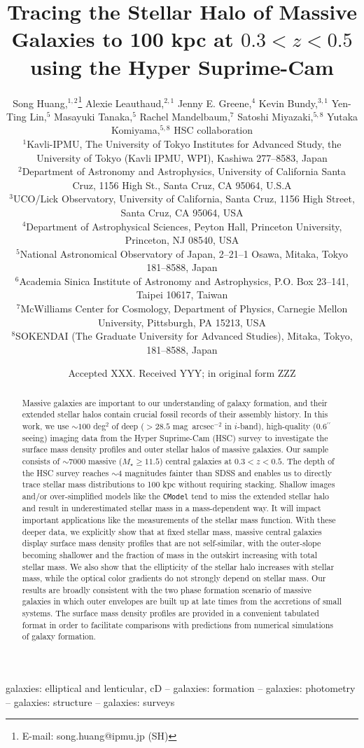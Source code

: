 \documentclass[a4paper,fleqn,usenatbib]{mnras}
\title[Mass Dependent Stellar Halo in Massive Galaxies]{Tracing the Stellar Halo of 
	   Massive Galaxies to 100 kpc at $0.3<z<0.5$ using the Hyper Suprime-Cam}
\author[S. Huang et al.]{
        Song Huang,$^{1,2}$\thanks{E-mail: song.huang@ipmu.jp (SH)}
        Alexie Leauthaud,$^{2,1}$
        Jenny E. Greene,$^{4}$
        Kevin Bundy,$^{3,1}$
        \newauthor
        Yen-Ting Lin,$^{5}$
        Masayuki Tanaka,$^{5}$
        Rachel Mandelbaum,$^{7}$
        Satoshi Miyazaki,$^{5,8}$
        \newauthor
        Yutaka Komiyama,$^{5,8}$
        HSC collaboration 
        \\
        $^{1}$Kavli-IPMU, The University of Tokyo Institutes for Advanced Study, 
              the University of Tokyo (Kavli IPMU, WPI), Kashiwa 277--8583, Japan\\
        $^{2}$Department of Astronomy and Astrophysics, University of California 
              Santa Cruz, 1156 High St., Santa Cruz, CA 95064, U.S.A\\
        $^{3}$UCO/Lick Observatory, University of California, Santa Cruz,
              1156 High Street, Santa Cruz, CA 95064, USA\\
        $^{4}$Department of Astrophysical Sciences, Peyton Hall,
              Princeton University, Princeton, NJ 08540, USA \\
        $^{5}$National Astronomical Observatory of Japan, 2--21--1 Osawa, Mitaka, 
              Tokyo 181--8588, Japan\\
        $^{6}$Academia Sinica Institute of Astronomy and Astrophysics, 
              P.O. Box 23--141, Taipei 10617, Taiwan\\
        $^{7}$McWilliams Center for Cosmology, Department of Physics, 
              Carnegie Mellon University, Pittsburgh, PA 15213, USA\\
        $^{8}$SOKENDAI (The Graduate University for Advanced Studies), Mitaka,
              Tokyo, 181--8588, Japan
        }
\date{Accepted XXX. Received YYY; in original form ZZZ}
\def\asec{$^{\prime\prime}$}
\def\sb{mag~arcsec$^{-2}$}
\def\mstar{{$M_{\star}$}}
\begin{document}
\label{firstpage}
\pagerange{\pageref{firstpage}--\pageref{lastpage}}

\maketitle


\begin{abstract} 
    
    Massive galaxies are important to our understanding of galaxy formation, and 
    their extended stellar halos contain crucial fossil records of their assembly 
    history. 
    In this work, we use ${\sim}100$ deg$^2$ of deep ($>28.5$ \sb{} in $i$-band), 
    high-quality (0.6\asec seeing) imaging data from the Hyper Suprime-Cam (HSC) 
    survey to investigate the surface mass density profiles and outer stellar halos 
    of massive galaxies. 
    Our sample consists of ${\sim}7000$ massive (\mstar{}$\geq 11.5$) central galaxies 
    at $0.3 < z < 0.5$. 
    The depth of the HSC survey reaches ${\sim}4$ magnitudes fainter than SDSS and 
    enables us to directly trace stellar mass distributions to 100 kpc without 
    requiring stacking. 
    Shallow images and/or over-simplified models like the \texttt{CModel} tend to 
    miss the extended stellar halo and result in underestimated stellar mass in a 
    mass-dependent way.  
    It will impact important applications like the measurements of the stellar mass 
    function. 
    With these deeper data, we explicitly show that at fixed stellar mass,
    massive central galaxies display surface mass density profiles that are not 
    self-similar, with the outer-slope becoming shallower and the fraction of mass 
    in the outskirt increasing with total stellar mass.
    We also show that the ellipticity of the stellar halo increases with stellar
    mass, while the optical color gradients do not strongly depend on stellar mass.
    Our results are broadly consistent with the two phase formation scenario of 
    massive galaxies in which outer envelopes are built up at late times from the 
    accretions of small systems. 
    The surface mass density profiles are provided in a convenient tabulated format 
    in order to facilitate comparisons with predictions from numerical simulations 
    of galaxy formation.
           
\end{abstract}

\begin{keywords}
    galaxies: elliptical and lenticular, cD --
    galaxies: formation --
    galaxies: photometry -- 
    galaxies: structure -- 
    galaxies: surveys
\end{keywords}
\end{document}
